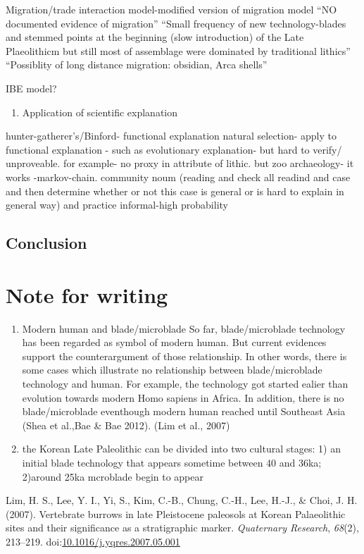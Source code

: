 \documentclass[american,man]{apa6}
\begin{document}
Migration/trade interaction model-modified version of migration model
\enquote{NO documented evidence of migration} \enquote{Small frequency
of new technology-blades and stemmed points at the beginning (slow
introduction) of the Late Plaeolithicm but still most of assemblage were
dominated by traditional lithics} \enquote{Possiblity of long distance
migration: obsidian, Arca shells}

IBE model?

\begin{enumerate}
\def\labelenumi{\arabic{enumi})}
\setcounter{enumi}{1}
\itemsep1pt\parskip0pt
\item
  Application of scientific explanation
\end{enumerate}

hunter-gatherer's/Binford- functional explanation natural selection-
apply to functional explanation - such as evolutionary explanation- but
hard to verify/ unproveable. for example- no proxy in attribute of
lithic. but zoo archaeology- it works -markov-chain. community noum
(reading and check all readind and case and then determine whether or
not this case is general or is hard to explain in general way) and
practice informal-high probability

\subsection{Conclusion}\label{conclusion}

\section{Note for writing}\label{note-for-writing}

\begin{enumerate}
\def\labelenumi{(\arabic{enumi})}
\item
  Modern human and blade/microblade So far, blade/microblade technology
  has been regarded as symbol of modern human. But current evidences
  support the counterargument of those relationship. In other words,
  there is some cases which illustrate no relationship between
  blade/microblade technology and human. For example, the technology got
  started ealier than evolution towards modern Homo sapiens in Africa.
  In addition, there is no blade/microblade eventhough modern human
  reached until Southeast Asia (Shea et al.,Bae \& Bae 2012). (Lim et
  al., 2007)
\item
  the Korean Late Paleolithic can be divided into two cultural stages:
  1) an initial blade technology that appears sometime between 40 and
  36ka; 2)around 25ka mcroblade begin to appear
\end{enumerate}

Lim, H. S., Lee, Y. I., Yi, S., Kim, C.-B., Chung, C.-H., Lee, H.-J., \&
Choi, J. H. (2007). Vertebrate burrows in late Pleistocene paleosols at
Korean Palaeolithic sites and their significance as a stratigraphic
marker. \emph{Quaternary Research}, \emph{68}(2), 213--219.
doi:\href{http://dx.doi.org/10.1016/j.yqres.2007.05.001}{10.1016/j.yqres.2007.05.001}
\end{document}

